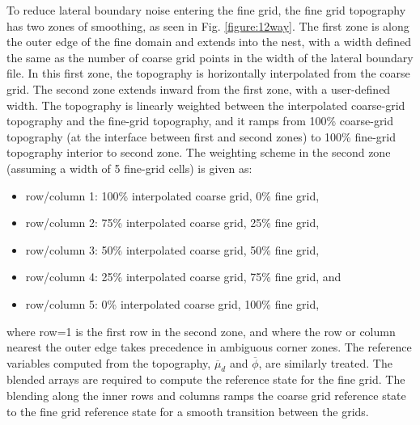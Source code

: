 To reduce lateral boundary noise entering the fine grid, the fine grid topography has two 
zones of smoothing, as seen in Fig. \ref{figure:12way}.
The first zone is along the outer edge of the fine domain and 
extends into the nest, with a width defined the same as the number of coarse grid points
in the width of the lateral boundary file.  In this first zone, the topography is horizontally
interpolated from the coarse grid.  The second zone extends inward from the first zone, with a
user-defined width.  The topography is linearly weighted between the interpolated coarse-grid
topography and the fine-grid topography, and it ramps from 100\% coarse-grid 
topography (at the interface between 
first and second zones) to 100\%
fine-grid topography interior to second zone.  
\noindent
The weighting scheme in the second zone (assuming a width of 5 fine-grid cells) is given as:
\begin{itemize}\setlength{\parskip}{-4pt}
\item row/column 1: 100\% interpolated coarse grid, 0\% fine grid,
\item row/column 2: 75\% interpolated coarse grid, 25\% fine grid,
\item row/column 3: 50\% interpolated coarse grid, 50\% fine grid,
\item row/column 4: 25\% interpolated coarse grid, 75\% fine grid, and
\item row/column 5: 0\% interpolated coarse grid, 100\% fine grid,
\end{itemize}
\noindent 
where row=1 is the first row in the second zone, and where the row or column 
nearest the outer edge takes precedence in ambiguous corner zones.  
The reference variables computed from the topography,
$\overline{\mu}_d$ and $\overline{\phi}$, are similarly treated.
The blended arrays are required to compute the reference state for the
fine grid.  The blending along the inner rows and columns ramps the 
coarse grid reference state to the
fine grid reference state for a smooth transition between the grids.

